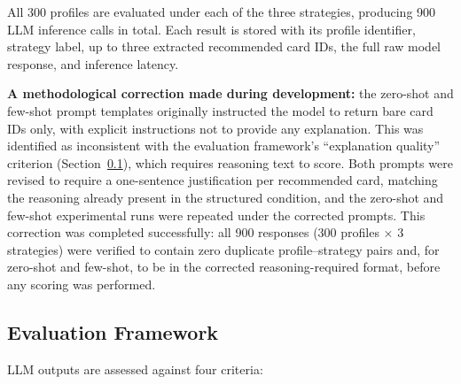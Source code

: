 All 300 profiles are evaluated under each of the three strategies, producing 900 LLM inference calls in total. Each result is stored with its profile identifier, strategy label, up to three extracted recommended card IDs, the full raw model response, and inference latency.

\textbf{A methodological correction made during development:} the zero-shot and few-shot prompt templates originally instructed the model to return bare card IDs only, with explicit instructions not to provide any explanation. This was identified as inconsistent with the evaluation framework's ``explanation quality'' criterion (Section~\ref{sec:evalframework}), which requires reasoning text to score. Both prompts were revised to require a one-sentence justification per recommended card, matching the reasoning already present in the structured condition, and the zero-shot and few-shot experimental runs were repeated under the corrected prompts. This correction was completed successfully: all 900 responses (300 profiles $\times$ 3 strategies) were verified to contain zero duplicate profile--strategy pairs and, for zero-shot and few-shot, to be in the corrected reasoning-required format, before any scoring was performed.

\subsection{Evaluation Framework}
\label{sec:evalframework}

LLM outputs are assessed against four criteria:

